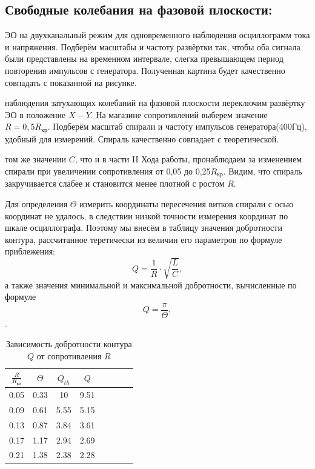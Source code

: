 \documentclass[a4paper,12pt]{article}
\begin{document}
\subsection{Свободные колебания на фазовой плоскости:}
\begin{enumerate}
 ЭО на двухканальный режим для одновременного наблюдения осциллограмм тока и напряжения. Подберём масштабы и частоту развёртки так, чтобы оба сигнала были представлены на временном интервале, слегка превышающем период повторения импульсов с генератора. Полученная картина будет качественно совпадать с показанной на рисунке.

 наблюдения затухающих колебаний на фазовой плоскости переключим развёртку ЭО в положение $X-Y$. На магазине сопротивлений выберем значение $R=0,5R_{\text{кр}}$. Подберём масштаб спирали и частоту импульсов генератора(400Гц), удобный для измерений. Спираль качественно совпадает с теоретической.

 том же значении $C$, что и в части II Хода работы, пронаблюдаем за изменением спирали при увеличении сопротивления от 0,05 до 0,25$R_{\text{кр}}$. Видим, что спираль закручивается слабее и становится менее плотной с ростом $R$.

Для определения $\Theta$ измерить координаты пересечения витков спирали с осью координат не удалось, в следствии низкой точности измерения координат по шкале осциллографа. Поэтому мы внесём в таблицу значения добротности контура, рассчитанное теретически из величин его параметров по формуле приблежения: \[Q={\frac{1}{R}}\cdot\sqrt{\frac{L}{C}},\] а также значения минимальной и максимальной добротности, вычисленные по формуле\[Q=\frac{\pi}{\Theta},\].

\begin{table}[h]
	\centering
	\begin{tabular}{|c|c|c|c|c|c|c|c|}
		\hline
		$\frac{R}{R_{\text{кр}}}$ & $\Theta$ & $Q_{th}$ & $Q$ \\ \hline
		 0.05  & 0.33 & 10 & 9.51\\ \hline
		 0.09  & 0.61 & 5.55 & 5.15\\ \hline
          0.13  & 0.87 & 3.84 & 3.61\\ \hline
          0.17  &  1.17& 2.94 &2.69\\ \hline
          0.21  &  1.38& 2.38 & 2.28\\ \hline
	\end{tabular}
 \caption{Зависимость добротности контура $Q$ от сопротивления $R$} \label{lst}
\end{table}


\end{enumerate}
\end{document}
